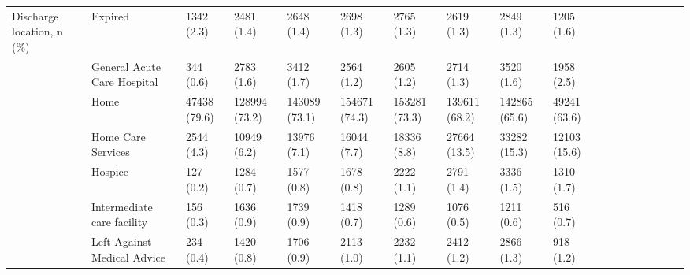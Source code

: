 \begin{tabular}{llllllllllllllllll}
Discharge location, n (\%) & Expired &                   1342 (2.3) &      2481 (1.4) &      2648 (1.4) &      2698 (1.3) &      2765 (1.3) &      2619 (1.3) &      2849 (1.3) &     1205 (1.6) &                   &                    &                    &                    &                    &                     &                     &                     \\
                                       & General Acute Care Hospital &                    344 (0.6) &      2783 (1.6) &      3412 (1.7) &      2564 (1.2) &      2605 (1.2) &      2714 (1.3) &      3520 (1.6) &     1958 (2.5) &                   &                    &                    &                    &                    &                     &                     &                     \\
                                       & Home &                 47438 (79.6) &   128994 (73.2) &   143089 (73.1) &   154671 (74.3) &   153281 (73.3) &   139611 (68.2) &   142865 (65.6) &   49241 (63.6) &                   &                    &                    &                    &                    &                     &                     &                     \\
                                       & Home Care Services &                   2544 (4.3) &     10949 (6.2) &     13976 (7.1) &     16044 (7.7) &     18336 (8.8) &    27664 (13.5) &    33282 (15.3) &   12103 (15.6) &                   &                    &                    &                    &                    &                     &                     &                     \\
                                       & Hospice &                    127 (0.2) &      1284 (0.7) &      1577 (0.8) &      1678 (0.8) &      2222 (1.1) &      2791 (1.4) &      3336 (1.5) &     1310 (1.7) &                   &                    &                    &                    &                    &                     &                     &                     \\
                                       & Intermediate care facility &                    156 (0.3) &      1636 (0.9) &      1739 (0.9) &      1418 (0.7) &      1289 (0.6) &      1076 (0.5) &      1211 (0.6) &      516 (0.7) &                   &                    &                    &                    &                    &                     &                     &                     \\
                                       & Left Against Medical Advice &                    234 (0.4) &      1420 (0.8) &      1706 (0.9) &      2113 (1.0) &      2232 (1.1) &      2412 (1.2) &      2866 (1.3) &      918 (1.2) &                   &                    &                    &                    &                    &                     &                     &                     \\

\end{tabular}
